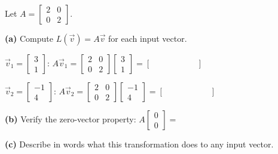\documentclass[10pt]{article}
\begin{document}
\begin{tcolorbox}[colback=white, colframe=black!40,
    title=\textbf{Tier R --- Reinforce},
    fonttitle=\bfseries, arc=2mm, left=3mm, right=3mm, top=2mm, bottom=2mm]
\small
Let $A = \begin{bmatrix}2 & 0 \\ 0 & 2\end{bmatrix}$.

\textbf{(a)} Compute $L(\vec{v}) = A\vec{v}$ for each input vector.

\vspace{0.06in}
$\vec{v}_1 = \begin{bmatrix}3\\1\end{bmatrix}$: \quad
$A\vec{v}_1 = \begin{bmatrix}2&0\\0&2\end{bmatrix}\begin{bmatrix}3\\1\end{bmatrix}
= \begin{bmatrix}\hspace{2cm}\\\hspace{2cm}\end{bmatrix}$

\vspace{0.12in}
$\vec{v}_2 = \begin{bmatrix}-1\\4\end{bmatrix}$: \quad
$A\vec{v}_2 = \begin{bmatrix}2&0\\0&2\end{bmatrix}\begin{bmatrix}-1\\4\end{bmatrix}
= \begin{bmatrix}\hspace{2cm}\\\hspace{2cm}\end{bmatrix}$

\vspace{0.12in}
\textbf{(b)} Verify the zero-vector property: $A\begin{bmatrix}0\\0\end{bmatrix} = $ \blank{2.5cm}

\vspace{0.10in}
\textbf{(c)} Describe in words what this transformation does to any input vector.

\end{tcolorbox}
\end{document}
